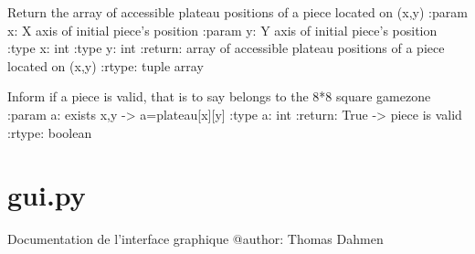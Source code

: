 \documentclass[letterpaper,10pt,french]{sphinxmanual}
\begin{document}

\begin{fulllineitems}
\label{\detokenize{autodoc:echecs.tour_Blanc}}
\end{fulllineitems}


\begin{fulllineitems}
\label{\detokenize{autodoc:echecs.valeurs_accessibles}}
Return the array of accessible plateau positions of a piece located on (x,y)
:param x: X axis of initial piece’s position
:param y: Y axis of initial piece’s position
:type x: int
:type y: int
:return: array of accessible plateau positions of a piece located on (x,y)
:rtype: tuple array

\end{fulllineitems}


\begin{fulllineitems}
\label{\detokenize{autodoc:echecs.valeurs_accessibles_test}}
\end{fulllineitems}


\begin{fulllineitems}
\label{\detokenize{autodoc:echecs.valide}}
Inform if a piece is valid, that is to say belongs to the 8*8 square gamezone
:param a: exists x,y -\textgreater{} a=plateau{[}x{]}{[}y{]}
:type a: int
:return: True -\textgreater{} piece is valid
:rtype: boolean

\end{fulllineitems}



\section{gui.py}
\label{\detokenize{autodoc:gui-py}}
Documentation de l’interface graphique
\label{\detokenize{autodoc:module-gui}}
@author: Thomas Dahmen
\end{document}
